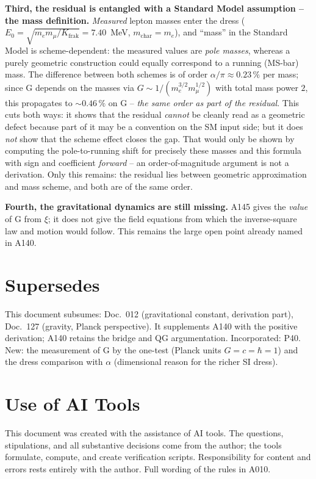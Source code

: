 \textbf{Third, the residual is entangled with a Standard Model assumption --
the mass definition.} \emph{Measured} lepton masses enter the dress
($E_0=\sqrt{m_e m_\mu/K_\text{frak}}=7.40$~MeV, $m_\text{char}=m_e$), and ``mass'' in the Standard
Model is scheme-dependent: the measured values are \emph{pole masses}, whereas a
purely geometric construction could equally correspond to a running (MS-bar) mass.
The difference between both schemes is of order $\alpha/\pi \approx 0{.}23\,\%$
per mass; since G depends on the masses via $G\sim 1/(m_e^{3/2} m_\mu^{1/2})$
with total mass power $2$, this propagates to $\sim 0{.}46\,\%$ on G -- \emph{the
same order as part of the residual}. This cuts both ways: it shows that the residual
\emph{cannot} be cleanly read as a geometric defect because part of it may be a
convention on the SM input side; but it does \emph{not} show that the scheme
effect closes the gap. That would only be shown by computing the pole-to-running
shift for precisely these masses and this formula with sign and coefficient
\emph{forward} -- an order-of-magnitude argument is not a derivation. Only this
remains: the residual lies between geometric approximation and mass scheme, and
both are of the same order.

\textbf{Fourth, the gravitational dynamics are still missing.} A145 gives the
\emph{value} of G from $\xi$; it does not give the field equations from which
the inverse-square law and motion would follow. This remains the large open point
already named in A140.

\section{Supersedes}

This document subsumes: Doc.~012 (gravitational constant, derivation part),
Doc.~127 (gravity, Planck perspective). It supplements A140 with the positive
derivation; A140 retains the bridge and QG argumentation.
Incorporated: P40. New: the measurement of G by the one-test (Planck units
$G=c=\hbar=1$) and the dress comparison with $\alpha$ (dimensional reason for
the richer SI dress).

\section{Use of AI Tools}

This document was created with the assistance of AI tools. The questions,
stipulations, and all substantive decisions come from the author; the tools
formulate, compute, and create verification scripts.
Responsibility for content and errors rests entirely with the author.
Full wording of the rules in A010.
